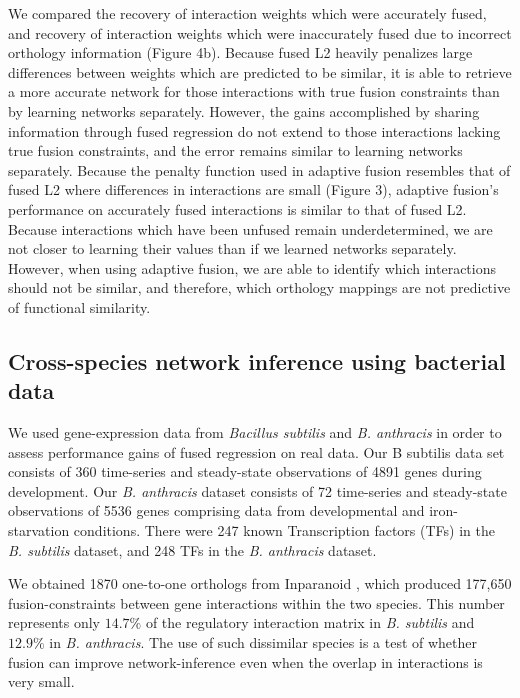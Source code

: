 \documentclass[11pt]{article}
\begin{document}
We compared the recovery of interaction weights which were accurately fused, and recovery of interaction weights which were inaccurately fused due to incorrect orthology information (Figure 4b). Because fused L2 heavily penalizes large differences between weights which are predicted to be similar, it is able to retrieve a more accurate network for those interactions with true fusion constraints than by learning networks separately. However, the gains accomplished by sharing information through fused regression do not extend to those interactions lacking true fusion constraints, and the error remains similar to learning networks separately. Because the penalty function used in adaptive fusion resembles that of fused L2 where differences in interactions are small (Figure 3), adaptive fusion's performance on accurately fused interactions is similar to that of fused L2. Because interactions which have been unfused remain underdetermined, we are not closer to learning their values than if we learned networks separately. However, when using adaptive fusion, we are able to identify which interactions should not be similar, and therefore, which orthology mappings are not predictive of functional similarity. 


\subsection{Cross-species network inference using bacterial data}
We used gene-expression data from \textit{\textit{Bacillus subtilis}} and \textit{\textit{B. anthracis}} in order to assess performance gains of fused regression on real data. Our B subtilis data set consists of 360 time-series and steady-state observations of 4891 genes during development. Our \textit{\textit{B. anthracis}} dataset consists of 72 time-series and steady-state observations of 5536 genes comprising data from developmental and iron-starvation conditions. There were 247 known Transcription factors (TFs) in the \textit{\textit{B. subtilis}} dataset, and 248 TFs in the \textit{B. anthracis} dataset. 

We obtained 1870 one-to-one orthologs from Inparanoid \cite{ostlund_inparanoid_2010}, which produced 177,650 fusion-constraints between gene interactions within the two species. This number represents only $14.7\%$ of the regulatory interaction matrix in \textit{B. subtilis} and $12.9\%$ in \textit{B. anthracis}. The use of such dissimilar species is a test of whether fusion can improve network-inference even when the overlap in interactions is very small. 
\end{document}

